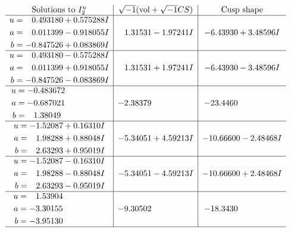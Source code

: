 \documentclass[1p]{elsarticle_modified}
\theoremstyle{definition}
\newcommand{\I}{\sqrt{-1}}
\begin{document}
$$\begin{array}{c|c|c}  
\text{Solutions to }I^u_{2}& \I (\text{vol} + \sqrt{-1}CS) & \text{Cusp shape}\\
 \hline 
\begin{aligned}
u &= \phantom{-}0.493180 + 0.575288 I \\
a &= \phantom{-}0.011399 - 0.918055 I \\
b &= -0.847526 + 0.083869 I\end{aligned}
 & \phantom{-}1.31531 - 1.97241 I & -6.43930 + 3.48596 I \\ \hline\begin{aligned}
u &= \phantom{-}0.493180 - 0.575288 I \\
a &= \phantom{-}0.011399 + 0.918055 I \\
b &= -0.847526 - 0.083869 I\end{aligned}
 & \phantom{-}1.31531 + 1.97241 I & -6.43930 - 3.48596 I \\ \hline\begin{aligned}
u &= -0.483672\phantom{ +0.000000I} \\
a &= -0.687021\phantom{ +0.000000I} \\
b &= \phantom{-}1.38049\phantom{ +0.000000I}\end{aligned}
 & -2.38379\phantom{ +0.000000I} & -23.4460\phantom{ +0.000000I} \\ \hline\begin{aligned}
u &= -1.52087 + 0.16310 I \\
a &= \phantom{-}1.98288 + 0.88048 I \\
b &= \phantom{-}2.63293 + 0.95019 I\end{aligned}
 & -5.34051 + 4.59213 I & -10.66600 - 2.48468 I \\ \hline\begin{aligned}
u &= -1.52087 - 0.16310 I \\
a &= \phantom{-}1.98288 - 0.88048 I \\
b &= \phantom{-}2.63293 - 0.95019 I\end{aligned}
 & -5.34051 - 4.59213 I & -10.66600 + 2.48468 I \\ \hline\begin{aligned}
u &= \phantom{-}1.53904\phantom{ +0.000000I} \\
a &= -3.30155\phantom{ +0.000000I} \\
b &= -3.95130\phantom{ +0.000000I}\end{aligned}
 & -9.30502\phantom{ +0.000000I} & -18.3430\phantom{ +0.000000I}\\
 \hline 
 \end{array}$$\newpage
\end{document}
